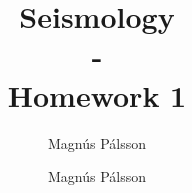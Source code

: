 \documentclass{article}
\date{}
\author{Magnús Pálsson}
\title{Seismology \\ - \\ \large Homework 1}
\author{Magnús Pálsson}
\begin{document}
\maketitle


\pagebreak

\pagebreak

\pagebreak

\pagebreak

\end{document}

